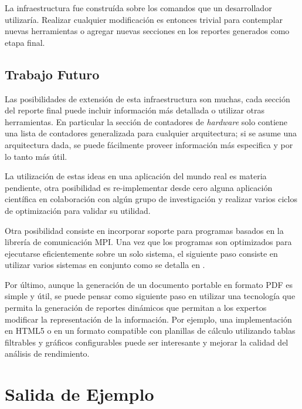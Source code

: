 \documentclass[a4paper]{report}
\begin{document}
\bigskip

La infraestructura fue construída sobre los comandos que un desarrollador utilizaría. Realizar cualquier modificación es entonces trivial para contemplar nuevas herramientas
o agregar nuevas secciones en los reportes generados como etapa final.

\section{Trabajo Futuro}

Las posibilidades de extensión de esta infraestructura son muchas, cada sección del reporte final puede incluir información más detallada o utilizar otras herramientas. En particular la sección de contadores de {\it hardware} solo contiene una lista de contadores generalizada para cualquier arquitectura; si se asume una arquitectura dada, se puede fácilmente proveer información más especifica y por lo tanto más útil.

\bigskip

La utilización de estas ideas en una aplicación del mundo real es materia pendiente, otra posibilidad es re-implementar desde cero alguna aplicación
científica en colaboración con algún grupo de investigación y realizar varios ciclos de optimización para validar su utilidad.

\bigskip

Otra posibilidad consiste en incorporar soporte para programas basados en la librería de comunicación MPI. Una vez que los programas son optimizados para ejecutarse eficientemente sobre un solo sistema, el siguiente paso consiste en utilizar varios sistemas en conjunto como se detalla en \cite{beowulf-parallel-workstation} \cite{tinetti}.

\bigskip

Por último, aunque la generación de un documento portable en formato PDF es simple y útil, se puede pensar como siguiente paso en utilizar una tecnología que permita la generación de reportes dinámicos que permitan a los expertos modificar la representación de la información. Por ejemplo, una implementación en HTML5 o en un formato compatible con planillas de cálculo utilizando tablas filtrables y gráficos configurables puede ser interesante y mejorar la calidad del análisis de rendimiento.



\appendix

\chapter{Salida de Ejemplo} \label{chapter:output}
\end{document}
